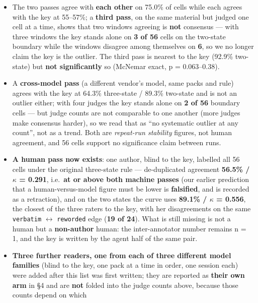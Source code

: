 \documentclass[
]{article}
\providecommand{\tightlist}{%
  \setlength{\itemsep}{0pt}\setlength{\parskip}{0pt}}
\begin{document}
\begin{enumerate}
  \begin{itemize}
  \tightlist
  \item
    The two passes agree with \textbf{each other} on 75.0\% of cells
    while each agrees with the key at 55--57\%; a \textbf{third pass},
    on the same material but judged one cell at a time, shows that two
    windows agreeing is \textbf{not} consensus --- with three windows
    the key stands alone on \textbf{3 of 56} cells on the two-state
    boundary while the windows disagree among themselves on \textbf{6},
    so we no longer claim the key is the outlier. The third pass is
    nearest to the key (92.9\% two-state) but \textbf{not significantly}
    so (McNemar exact, p = 0.063--0.38).
  \item
    A \textbf{cross-model pass} (a different vendor's model, same packs
    and rule) agrees with the key at 64.3\% three-state / 89.3\%
    two-state and is not an outlier either; with four judges the key
    stands alone on \textbf{2 of 56} boundary cells --- but judge counts
    are not comparable to one another (more judges make consensus
    harder), so we read that as ``no systematic outlier at any count'',
    not as a trend. Both are \emph{repeat-run stability} figures, not
    human agreement, and 56 cells support no significance claim between
    runs.
  \item
    \textbf{A human pass now exists}: one author, blind to the key,
    labelled all 56 cells under the original three-state rule ---
    de-duplicated agreement \textbf{56.5\% / \ensuremath{\kappa} =
    0.291}, i.e.~\textbf{at or above both machine passes} (our earlier
    prediction that a human-versus-model figure must be lower is
    \textbf{falsified}, and is recorded as a retraction), and on the two
    states the curve uses \textbf{89.1\% / \ensuremath{\kappa} = 0.556},
    the closest of the three raters to the key, with her disagreements
    on the same \texttt{verbatim} \ensuremath{\leftrightarrow}
    \texttt{reworded} edge (\textbf{19 of 24}). What is still missing is
    not a human but a \textbf{non-author} human: the inter-annotator
    number remains n = 1, and the key is written by the agent half of
    the same pair.
  \item
    \textbf{Three further readers, one from each of three different
    model families} (blind to the key, one pack at a time in order, one
    session each) were added after this list was first written; they are
    reported as \textbf{their own arm} in §4 and are \textbf{not} folded
    into the judge counts above, because those counts depend on which

\end{itemize}
\end{enumerate}
\end{document}
